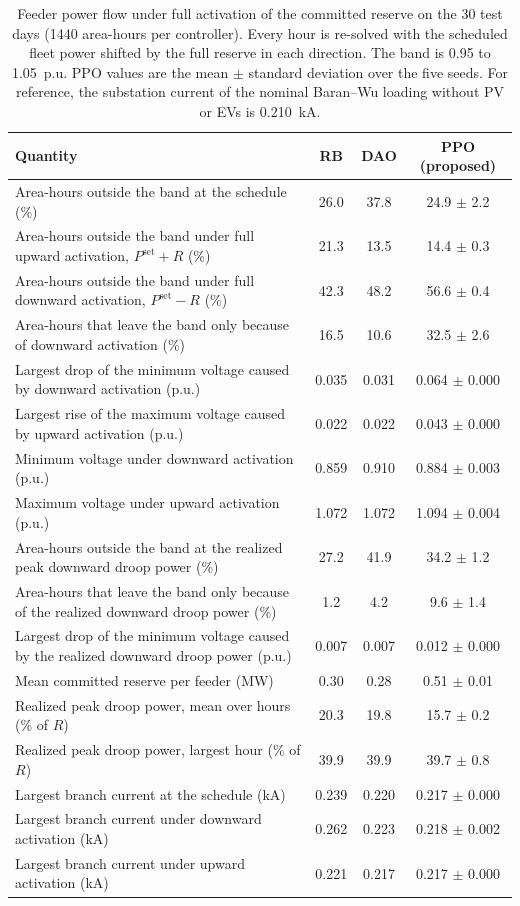 \begin{table}[!t]
\caption{Feeder power flow under full activation of the committed reserve on the 30 test days (1440 area-hours per controller). Every hour is re-solved with the scheduled fleet power shifted by the full reserve in each direction. The band is 0.95 to 1.05~p.u. PPO values are the mean $\pm$ standard deviation over the five seeds. For reference, the substation current of the nominal Baran--Wu loading without PV or EVs is 0.210~kA.}
\label{tab:activation}
\centering
\footnotesize
\begin{tabular}{lccc}
\toprule
\textbf{Quantity} & \textbf{RB} & \textbf{DAO} & \textbf{PPO (proposed)}\\
\midrule
Area-hours outside the band at the schedule (\%) & 26.0 & 37.8 & 24.9 $\pm$ 2.2 \\
Area-hours outside the band under full upward activation, $P^{\mathrm{set}}+R$ (\%) & 21.3 & 13.5 & 14.4 $\pm$ 0.3 \\
Area-hours outside the band under full downward activation, $P^{\mathrm{set}}-R$ (\%) & 42.3 & 48.2 & 56.6 $\pm$ 0.4 \\
Area-hours that leave the band only because of downward activation (\%) & 16.5 & 10.6 & 32.5 $\pm$ 2.6 \\
Largest drop of the minimum voltage caused by downward activation (p.u.) & 0.035 & 0.031 & 0.064 $\pm$ 0.000 \\
Largest rise of the maximum voltage caused by upward activation (p.u.) & 0.022 & 0.022 & 0.043 $\pm$ 0.000 \\
Minimum voltage under downward activation (p.u.) & 0.859 & 0.910 & 0.884 $\pm$ 0.003 \\
Maximum voltage under upward activation (p.u.) & 1.072 & 1.072 & 1.094 $\pm$ 0.004 \\
Area-hours outside the band at the realized peak downward droop power (\%) & 27.2 & 41.9 & 34.2 $\pm$ 1.2 \\
Area-hours that leave the band only because of the realized downward droop power (\%) & 1.2 & 4.2 & 9.6 $\pm$ 1.4 \\
Largest drop of the minimum voltage caused by the realized downward droop power (p.u.) & 0.007 & 0.007 & 0.012 $\pm$ 0.000 \\
Mean committed reserve per feeder (MW) & 0.30 & 0.28 & 0.51 $\pm$ 0.01 \\
Realized peak droop power, mean over hours (\% of $R$) & 20.3 & 19.8 & 15.7 $\pm$ 0.2 \\
Realized peak droop power, largest hour (\% of $R$) & 39.9 & 39.9 & 39.7 $\pm$ 0.8 \\
Largest branch current at the schedule (kA) & 0.239 & 0.220 & 0.217 $\pm$ 0.000 \\
Largest branch current under downward activation (kA) & 0.262 & 0.223 & 0.218 $\pm$ 0.002 \\
Largest branch current under upward activation (kA) & 0.221 & 0.217 & 0.217 $\pm$ 0.000 \\
\bottomrule
\end{tabular}
\end{table}
